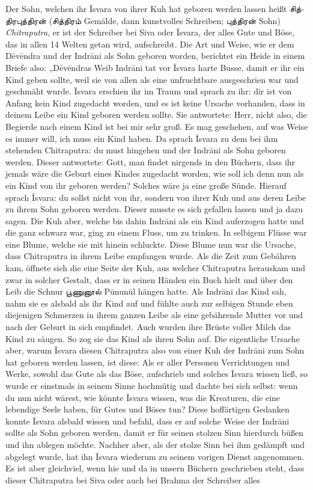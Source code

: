\documentclass{article}
\newcommand{\TamilText}[1]{\texttamil{#1}}
\newcommand{\tam}[1]{\TamilText{#1}}
\begin{document}
Der Sohn, welchen ihr \={I}svara von ihrer Kuh hat geboren werden lassen heißt \tam{சித்திரபுத்திரன்} (\tam{சித்திரம்} Gemälde, dann kunstvolles Schreiben; \tam{புத்திரன்} Sohn) \emph{Chitraputra}, er ist der Schreiber bei Siva oder \={I}svara, der alles Gute und Böse, das in allen 14 Welten getan wird, aufschreibt. Die Art und Weise, wie er dem D\={e}v\={e}ndra und der Indr\={a}ni als Sohn geboren worden, berichtet ein Heide in einem Briefe also: „D\={e}v\={e}ndras Weib Indr\={a}ni tat vor \={I}svara harte Busse, damit er ihr ein Kind geben sollte, weil sie von allen als eine unfruchtbare ausgeschrien war und geschmäht wurde. \={I}svara erschien ihr im Traum und sprach zu ihr: dir ist von Anfang kein Kind zugedacht worden, und es ist keine Ursache vorhanden, dass in deinem Leibe ein Kind geboren werden sollte. Sie antwortete: Herr, nicht also, die Begierde nach einem Kind ist bei mir sehr groß. Es mag geschehen, auf was Weise es immer will, ich muss ein Kind haben. Da sprach \={I}svara zu dem bei ihm stehenden Chitraputra: du must hingehen und der Indr\={a}ni als Sohn geboren werden. Dieser antwortete: Gott, man findet nirgends in den Büchern, dass ihr jemals wäre die Geburt eines Kindes zugedacht worden, wie soll ich denn nun als ein Kind von ihr geboren werden? Solches wäre ja eine große Sünde. Hierauf sprach \={I}svara: du sollst nicht von ihr, sondern von ihrer Kuh und aus deren Leibe zu ihrem Sohn geboren werden. Dieser musste es sich gefallen lassen und ja dazu sagen. Die Kuh aber, welche bis dahin Indr\={a}ni als ein Kind auferzogen hatte und die ganz schwarz war, ging zu einem Fluss, um zu trinken. In selbigem Flüsse war eine Blume, welche sie mit hinein schluckte. Diese Blume nun war die Ursache, dass Chitraputra in ihrem Leibe empfangen wurde. Als die Zeit zum Gebähren kam, öffnete sich die eine Seite der Kuh, aus welcher Chitraputra herauskam und zwar in solcher Gestalt, dass er in seinen Händen ein Buch hielt und über den Leib die Schnur \tam{பூணுனூல்} P\={u}nun\={u}l hängen hatte. Als Indr\={a}ni das Kind sah, nahm sie es alsbald als ihr Kind auf und fühlte auch zur selbigen Stunde eben diejenigen Schmerzen in ihrem ganzen Leibe als eine gebährende Mutter vor und nach der Geburt in sich empfindet. Auch wurden ihre Brüste voller Milch das Kind zu säugen. So zog sie das Kind als ihren Sohn auf. Die eigentliche Ursache aber, warum \={I}svara diesen Chitraputra also von einer Kuh der Indr\={a}ni zum Sohn hat geboren werden lassen, ist diese: Als er aller Personen Verrichtungen und Werke, sowohl das Gute als das Böse, aufschrieb und solches \={I}svara wissen ließ, so wurde er einstmals in seinem Sinne hochmütig und dachte bei sich selbst: wenn du nun nicht wärest, wie könnte \={I}svara wissen, was die Kreaturen, die eine lebendige Seele haben, für Gutes und Böses tun? Diese hoffärtigen Gedanken konnte \={I}svara alsbald wissen und befahl, dass er auf solche Weise der Indr\={a}ni sollte als Sohn geboren werden, damit er für seinen stolzen Sinn hierdurch büßen und ihn ablegen möchte. Nachher aber, als der stolze Sinn bei ihm gedämpft und abgelegt wurde, hat ihn \={I}svara wiederum zu seinem vorigen Dienst angenommen. Es ist aber gleichviel, wenn hie und da in unsern Büchern geschrieben steht, dass dieser Chitraputra bei Siva oder auch bei Brahma der Schreiber alles 
\end{document}
